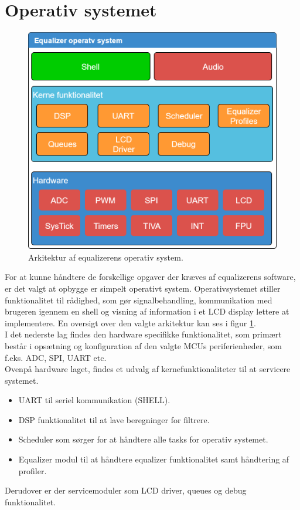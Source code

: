 \section{Operativ systemet}

\begin{figure}[h!]
	\centering
	\includegraphics[width=.5\textwidth]{billeder/eq_os.png}
	\caption{Arkitektur af equalizerens operativ system.}
	\label{fig:eq_os}
\end{figure}

For at kunne håndtere de forskellige opgaver der kræves af equalizerens software, er det valgt at opbygge er simpelt operativt system.
Operativsystemet stiller funktionalitet til rådighed, som gør signalbehandling, kommunikation med brugeren igennem en shell og visning af information i et LCD display lettere at implementere. En oversigt over den valgte arkitektur kan ses i figur \ref{fig:eq_os}.\\

I det nederste lag findes den hardware specifikke funktionalitet, som primært består i opsætning og konfiguration af den valgte MCUs periferienheder, som f.eks. ADC, SPI, UART etc.\\
 
Ovenpå hardware laget, findes et udvalg af kernefunktionaliteter til at servicere systemet.
\begin{itemize}[noitemsep]
	\item UART til seriel kommunikation (SHELL).
	\item DSP funktionalitet til at lave beregninger for filtrere.
	\item Scheduler som sørger for at håndtere alle tasks for operativ systemet.
	\item Equalizer modul til at håndtere equalizer funktionalitet samt håndtering af profiler. 
\end{itemize}

Derudover er der servicemoduler som LCD driver, queues og debug funktionalitet.\\

